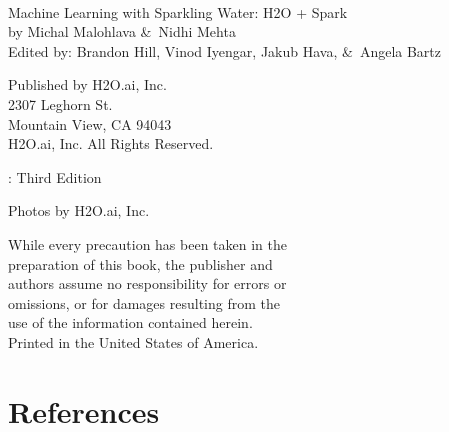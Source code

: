 {\raggedright\vfill\ 

Machine Learning with Sparkling Water: H2O + Spark\\
  by Michal Malohlava \&\ Nidhi Mehta\\
  Edited by: Brandon Hill, Vinod Iyengar, Jakub Hava, \&\ Angela Bartz 
  
\bigskip
  Published by H2O.ai, Inc. \\
2307 Leghorn St. \\
Mountain View, CA 94043\\
\bigskip
\textcopyright \hspace{1pt} \the\year \hspace{1pt} H2O.ai, Inc. All Rights Reserved. 
\bigskip

\monthname \hspace{1pt}  \the\year: Third Edition
\bigskip

Photos by \textcopyright H2O.ai, Inc. 
\bigskip

While every precaution has been taken in the\\
preparation of this book, the publisher and\\
authors assume no responsibility for errors or\\
omissions, or for damages resulting from the\\
use of the information contained herein.\\
\bigskip
Printed in the United States of America. 


}\par

\newpage
\tableofcontents

\newpage



%
%


%
%
\newpage

\newpage

%
%
\newpage


\newpage


%
%



\newpage






\section{References}

  











